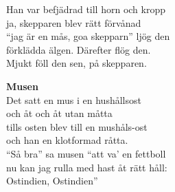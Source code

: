 Han var befjädrad till horn och kropp\\
ja, skepparen blev rätt förvånad\\
``jag är en mås, goa skepparn'' ljög den\\
förklädda älgen. Därefter flög den.\\
Mjukt föll den sen, på skepparen.\par
\vspace{15pt}
\textbf{Musen}\\
Det satt en mus i en hushållsost\\
och åt och åt utan måtta\\
tills osten blev till en mushåls-ost\\
och han en klotformad råtta.\\
``Så bra'' sa musen ``att va' en fettboll\\
nu kan jag rulla med hast åt rätt håll:\\
Ostindien, Ostindien''
